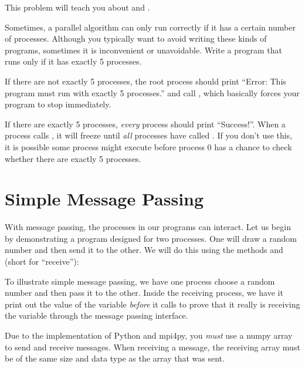 \begin{problem}
This problem will teach you about  and .

Sometimes, a parallel algorithm can only run correctly if it has a certain
number of processes. Although you typically want to avoid writing these kinds of
programs, sometimes it is inconvenient or unavoidable. Write a program that runs
only if it has exactly 5 processes.

If there are not exactly 5 processes, the root process should print ``Error:
This program must run with exactly 5 processes.'' and call ,
which basically forces your program to stop immediately.

If there are exactly 5 processes, \emph{every} process should print
``Success!''. When a process calls , it will freeze until
\emph{all} processes have called . If you don't use this, it
is possible some process might execute  before process 0
has a chance to check whether there are exactly 5 processes.
\label{prob:MPI_Intro:AbortBarrier.py}
\end{problem}

\section*{Simple Message Passing}
With message passing, the processes in our programs can interact. Let us begin
by demonstrating a program designed for two processes. One will draw a random
number and then send it to the other. We will do this using the methods
 and  (short for ``receive''):



To illustrate simple message passing, we have one process choose a random number
and then pass it to the other. Inside the receiving process, we have it print
out the value of the variable  \emph{before} it calls
 to prove that it really is receiving the variable through the message
passing interface.

\begin{warn}
Due to the implementation of Python and mpi4py, you \emph{must} use a numpy
array to send and receive messages. When receiving a message, the receiving
array must be of the same size and data type as the array that was sent.
\end{warn}

